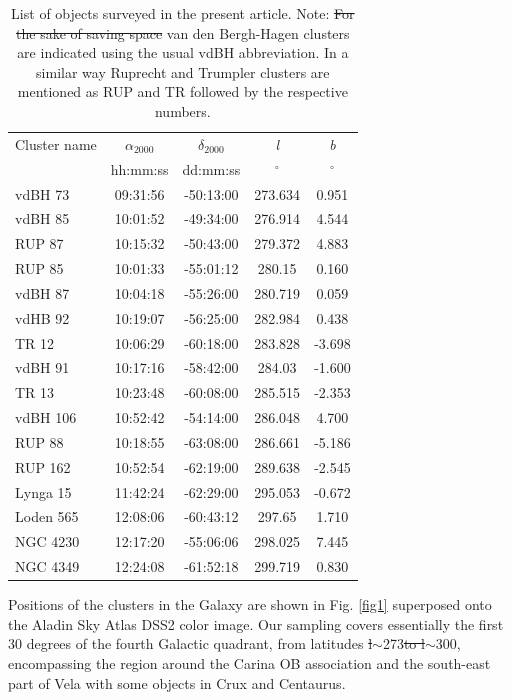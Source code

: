 \documentclass[draft]{aa}
\providecommand{\DIFaddtex}[1]{{\protect\color{blue}\uwave{#1}}} %
\providecommand{\DIFdeltex}[1]{{\protect\color{red}\sout{#1}}}                      %
\providecommand{\DIFaddbegin}{} %
\providecommand{\DIFaddend}{} %
\providecommand{\DIFdelbegin}{} %
\providecommand{\DIFdelend}{} %
\providecommand{\DIFdelFL}[1]{\DIFdel{#1}} %
\providecommand{\DIFdelbeginFL}{} %
\providecommand{\DIFdelendFL}{} %
\providecommand{\DIFadd}[1]{\texorpdfstring{\DIFaddtex{#1}}{#1}} %
\providecommand{\DIFdel}[1]{\texorpdfstring{\DIFdeltex{#1}}{}} %
\newcommand{\DIFscaledelfig}{0.5}
\newlength{\DIFdelgraphicswidth} %
\newlength{\DIFdelgraphicsheight} %
\newcommand{\DIFaddincludegraphics}[2][]{{\color{blue}\fbox{\DIFOincludegraphics[#1]{#2}}}} %
\newcommand{\DIFdelincludegraphics}[2][]{%
\sbox{\DIFdelgraphicsbox}{\DIFOincludegraphics[#1]{#2}}%
\settoboxwidth{\DIFdelgraphicswidth}{\DIFdelgraphicsbox} %
\settoboxtotalheight{\DIFdelgraphicsheight}{\DIFdelgraphicsbox} %
\scalebox{\DIFscaledelfig}{%
\parbox[b]{\DIFdelgraphicswidth}{\usebox{\DIFdelgraphicsbox}\\[-\baselineskip] \rule{\DIFdelgraphicswidth}{0em}}\llap{\resizebox{\DIFdelgraphicswidth}{\DIFdelgraphicsheight}{%
\setlength{\unitlength}{\DIFdelgraphicswidth}%
\begin{picture}(1,1)%
\thicklines\linethickness{2pt} %
{\color[rgb]{1,0,0}\put(0,0){\framebox(1,1){}}}%
{\color[rgb]{1,0,0}\put(0,0){\line( 1,1){1}}}%
{\color[rgb]{1,0,0}\put(0,1){\line(1,-1){1}}}%
\end{picture}%
}\hspace*{3pt}}} %
} %
\DeclareRobustCommand{\DIFaddbegin}{\DIFOaddbegin \let\includegraphics\DIFaddincludegraphics} %
\DeclareRobustCommand{\DIFaddend}{\DIFOaddend \let\includegraphics\DIFOincludegraphics} %
\DeclareRobustCommand{\DIFdelbegin}{\DIFOdelbegin \let\includegraphics\DIFdelincludegraphics} %
\DeclareRobustCommand{\DIFdelend}{\DIFOaddend \let\includegraphics\DIFOincludegraphics} %
\DeclareRobustCommand{\DIFdelbeginFL}{\DIFOdelbeginFL \let\includegraphics\DIFdelincludegraphics} %
\DeclareRobustCommand{\DIFdelendFL}{\DIFOaddendFL \let\includegraphics\DIFOincludegraphics} %
\begin{document}
\begin{table}[ht]
    \centering
    \begin{tabular}{lcccc}
    \hline 
        Cluster name & $\alpha_{2000}$ & $\delta_{2000}$ & \emph{l} & \emph{b}\\
         & hh:mm:ss & dd:mm:ss & $^\circ$ & $^\circ$\\
       \hline \hline 
        vdBH 73 & 09:31:56 & -50:13:00 & 273.634 & 0.951\\
        vdBH 85 & 10:01:52 & -49:34:00 & 276.914 & 4.544\\
        RUP 87 & 10:15:32 & -50:43:00 & 279.372 & 4.883\\
        RUP 85 & 10:01:33 & -55:01:12 & 280.15 & 0.160\\
        vdBH 87 & 10:04:18 & -55:26:00 & 280.719 & 0.059\\
        vdHB 92 & 10:19:07 & -56:25:00 & 282.984 & 0.438\\
        TR 12 & 10:06:29 & -60:18:00 & 283.828 & -3.698\\
        vdBH 91 & 10:17:16 & -58:42:00 & 284.03 & -1.600\\
        TR 13 & 10:23:48 & -60:08:00 & 285.515 & -2.353\\
        vdBH 106 & 10:52:42 & -54:14:00 & 286.048 & 4.700\\
        RUP 88 & 10:18:55 & -63:08:00 & 286.661 & -5.186\\
        RUP 162 & 10:52:54 & -62:19:00 & 289.638 & -2.545\\
        Lynga 15 & 11:42:24 & -62:29:00 & 295.053 & -0.672\\
        Loden 565 & 12:08:06 & -60:43:12 & 297.65 & 1.710\\
        NGC 4230 & 12:17:20 & -55:06:06 & 298.025 & 7.445\\
        NGC 4349 & 12:24:08 & -61:52:18 & 299.719 & 0.830\\
        \hline
    \end{tabular}
    \caption{List of objects surveyed in the present article.
    Note: \DIFdelbeginFL \DIFdelFL{For the sake of saving space }\DIFdelendFL van den Bergh-Hagen clusters are
    indicated using the usual vdBH abbreviation. In a similar
    way Ruprecht and Trumpler clusters are mentioned as RUP and TR followed
    by the respective numbers.}
    \label{tab:clust_list}
\end{table}

Positions of the clusters in the Galaxy are shown in Fig. \ref{fig1} superposed
onto the Aladin Sky Atlas DSS2 color image. Our sampling covers essentially the
first 30 degrees of the fourth Galactic quadrant, from latitudes
\DIFdelbegin \DIFdel{l$\sim$}\DIFdelend \DIFaddbegin \DIFadd{$l\sim$}\DIFaddend 273\DIFdelbegin \DIFdel{to
l$\sim$}\DIFdelend \DIFaddbegin \DIFadd{$^\circ$ to $l\sim$}\DIFaddend 300\DIFaddbegin \DIFadd{$^\circ$}\DIFaddend , encompassing the region around the
Carina OB association and the south-east part of Vela with some objects in Crux
and Centaurus.
\end{document}
